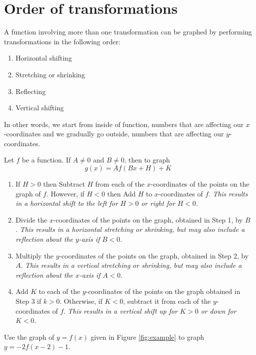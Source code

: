 \section{Order of transformations}
A function involving more than one transformation can be graphed by performing transformations in the following order:
\begin{enumerate}[label=\protect\circled{\arabic*}]
    \item Horizontal shifting
    \item Stretching or shrinking
    \item Reflecting
    \item Vertical shifting
\end{enumerate}
In other words, we start from inside of function, numbers that are affecting our $x$-coordinates and we gradually go outside, numbers that are affecting our $y$-coordinates.
\begin{tcolorbox}[title=Order of transformations,fonttitle=\bfseries,
colframe=blue!75!black,colback=blue!10!white]
%
Let $f$ be a function. If $A \ne 0$ and $B \ne 0$, then to graph
\begin{equation*}
                g(x) = Af(Bx+H)+K
\end{equation*} 
\begin{enumerate}[1.]
    \item If $H>0$ then Subtract $H$ from each of the $x$-coordinates of the points on the graph of $f$. However, if $H<0$ then Add $H$ to $x$-coordinates of $f$.\textit{ This results in a horizontal shift to the left for $H > 0$ or right for $H < 0$.}
    \item Divide the $x$-coordinates of the points on the graph, obtained in Step 1, by $B$. \textit{This results in a horizontal stretching or shrinking, but may also include a reflection about the $y$-axis if $B < 0$.}
    \item Multiply the $y$-coordinates of the points on the graph, obtained in Step 2, by $A$. \textit{This results in a vertical stretching or shrinking, but may also include a reflection about the $x$-axis if $A < 0$.}
    \item Add $K$ to each of the $y$-coordinates of the points on the graph obtained in Step 3 if $k>0$. Otherwise, if $K<0$, subtract it from each of the $y$-coordinates of $f$. \textit{This results in a vertical shift up for $K > 0$ or down for $K < 0$.}
\end{enumerate}
%
\end{tcolorbox}
\begin{exa}
    Use the graph of $y=f(x)$ given in Figure \ref{fig:example} to graph $y=-2f(x-2)-1$.
\end{exa}
